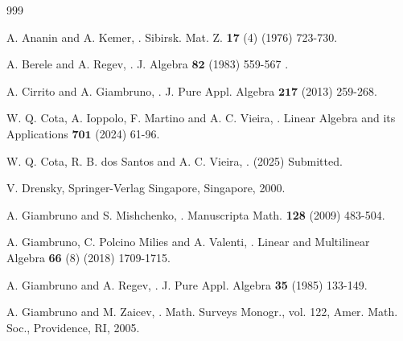 \documentclass{amsart}
\numberwithin{equation}{section}
\begin{document}
\begin{thebibliography}{999}
	
	

 A. Ananin and  A. Kemer, 
\label{A}
. Sibirsk. Mat. Z. {\bf 17} (4) (1976) 723-730.




 A. Berele and A. Regev, 
\label{BR}
. J. Algebra $\mathbf{82}$ (1983) 559-567 .



 A. Cirrito and  A. Giambruno, 
\label{GC}
. J. Pure Appl. Algebra $\mathbf{217}$ (2013) 259-268.


 W. Q. Cota, A. Ioppolo, F. Martino and A. C. Vieira, 
\label{CIMV}
. Linear Algebra and its Applications $\mathbf{701}$ (2024) 61-96.

 W. Q. Cota, R. B. dos Santos and A. C. Vieira, 
\label{CSV}
. (2025) Submitted.




 V. Drensky, 
\label{Dr}
Springer-Verlag Singapore, Singapore, 2000.




 A. Giambruno and S. Mishchenko,   
\label{GM}
. Manuscripta Math. {\bf 128} (2009) 483-504.


 

 A. Giambruno, C. Polcino Milies and A. Valenti, 
\label{GPV} 
. Linear and Multilinear Algebra {\bf 66} (8) (2018) 1709-1715.

 A. Giambruno and  A. Regev,  
\label{GR}
. J. Pure Appl. Algebra {\bf 35} (1985) 133-149.


 A. Giambruno and M. Zaicev, 
\label{livroGZ}
. Math. Surveys Monogr., vol. 122, Amer. Math. Soc., Providence, RI, 2005.




\end{thebibliography}
\end{document}
